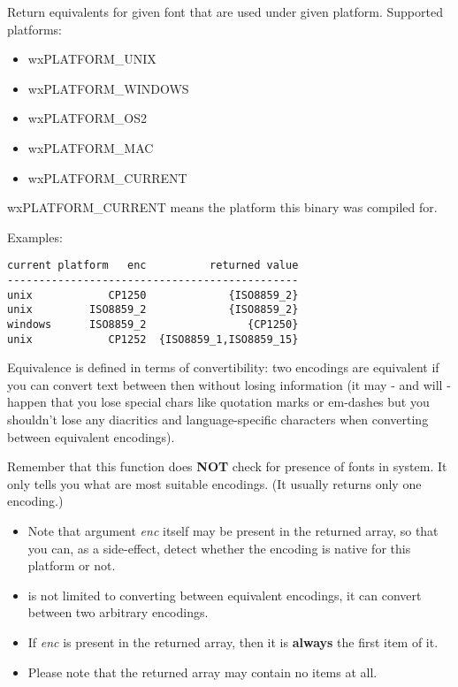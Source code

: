 \label{wxencodingconvertergetplatformequivalents}


Return equivalents for given font that are used
under given platform. Supported platforms:

\begin{itemize}\itemsep=0pt
\item wxPLATFORM\_UNIX
\item wxPLATFORM\_WINDOWS
\item wxPLATFORM\_OS2
\item wxPLATFORM\_MAC
\item wxPLATFORM\_CURRENT
\end{itemize}

wxPLATFORM\_CURRENT means the platform this binary was compiled for.

Examples:

\begin{verbatim}
current platform   enc          returned value
----------------------------------------------
unix            CP1250             {ISO8859_2}
unix         ISO8859_2             {ISO8859_2}
windows      ISO8859_2                {CP1250}
unix            CP1252  {ISO8859_1,ISO8859_15}
\end{verbatim}

Equivalence is defined in terms of convertibility:
two encodings are equivalent if you can convert text between
then without losing information (it may - and will - happen
that you lose special chars like quotation marks or em-dashes
but you shouldn't lose any diacritics and language-specific
characters when converting between equivalent encodings).

Remember that this function does {\bf NOT} check for presence of
fonts in system. It only tells you what are most suitable
encodings. (It usually returns only one encoding.)


\begin{itemize}\itemsep=0pt
\item Note that argument {\it enc} itself may be present in the returned array,
so that you can, as a side-effect, detect whether the
encoding is native for this platform or not.
\item {} is not limited to 
converting between equivalent encodings, it can convert between two arbitrary
encodings.
\item If {\it enc} is present in the returned array, then it is {\bf always} the first
item of it.
\item Please note that the returned array may contain no items at all.
\end{itemize}

